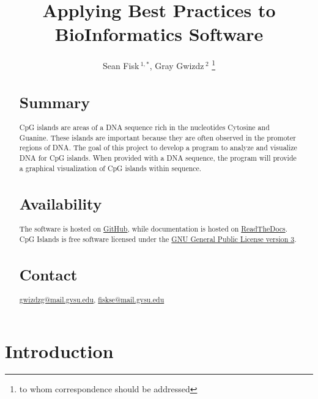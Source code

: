 \documentclass{bioinfo}
\begin{document}

\title[Applying Best Practices]{Applying Best Practices to BioInformatics Software}
\author[Sample \textit{et~al}]{Sean Fisk\,$^{1,*}$, Gray Gwizdz\,$^{2}$ \footnote{to whom correspondence should be addressed}}
\address{$^{1}$Grand Valley State University\\
$^{2}$Grand Valley State University}



\maketitle

\begin{abstract}

\section{Summary}
CpG islands are areas of a DNA sequence rich in the nucleotides Cytosine and Guanine. These islands are important because they are often observed in the promoter regions of DNA. The goal of this project to develop a program to analyze and visualize DNA for CpG islands. When provided with a DNA sequence, the program will provide a graphical visualization of CpG islands within sequence.

\section{Availability}
The software is hosted on \href{https://github.com/seanfisk/cpg-islands/}{GitHub}, while documentation is hosted on \href{https://cpg-islands.readthedocs.org/en/latest/}{ReadTheDocs}. CpG Islands is free software licensed under the \href{http://www.gnu.org/licenses/gpl.html#content}{GNU General Public License version 3}.

\section{Contact} \href{gwizdzg@mail.gvsu.edu}{gwizdzg@mail.gvsu.edu}, \href{fiskse@mail.gvsu.edu}{fiskse@mail.gvsu.edu}
\end{abstract}

\section{Introduction}
\end{document}
